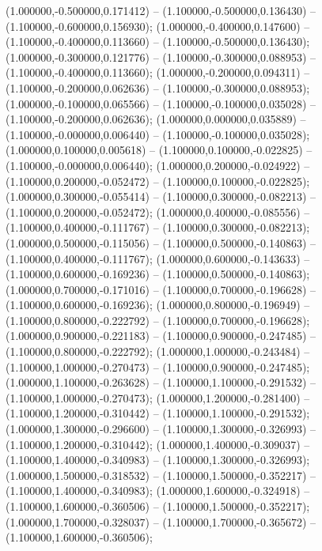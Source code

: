  (1.000000,-0.500000,0.171412) -- (1.100000,-0.500000,0.136430) -- (1.100000,-0.600000,0.156930);
 (1.000000,-0.400000,0.147600) -- (1.100000,-0.400000,0.113660) -- (1.100000,-0.500000,0.136430);
 (1.000000,-0.300000,0.121776) -- (1.100000,-0.300000,0.088953) -- (1.100000,-0.400000,0.113660);
 (1.000000,-0.200000,0.094311) -- (1.100000,-0.200000,0.062636) -- (1.100000,-0.300000,0.088953);
 (1.000000,-0.100000,0.065566) -- (1.100000,-0.100000,0.035028) -- (1.100000,-0.200000,0.062636);
 (1.000000,0.000000,0.035889) -- (1.100000,-0.000000,0.006440) -- (1.100000,-0.100000,0.035028);
 (1.000000,0.100000,0.005618) -- (1.100000,0.100000,-0.022825) -- (1.100000,-0.000000,0.006440);
 (1.000000,0.200000,-0.024922) -- (1.100000,0.200000,-0.052472) -- (1.100000,0.100000,-0.022825);
 (1.000000,0.300000,-0.055414) -- (1.100000,0.300000,-0.082213) -- (1.100000,0.200000,-0.052472);
 (1.000000,0.400000,-0.085556) -- (1.100000,0.400000,-0.111767) -- (1.100000,0.300000,-0.082213);
 (1.000000,0.500000,-0.115056) -- (1.100000,0.500000,-0.140863) -- (1.100000,0.400000,-0.111767);
 (1.000000,0.600000,-0.143633) -- (1.100000,0.600000,-0.169236) -- (1.100000,0.500000,-0.140863);
 (1.000000,0.700000,-0.171016) -- (1.100000,0.700000,-0.196628) -- (1.100000,0.600000,-0.169236);
 (1.000000,0.800000,-0.196949) -- (1.100000,0.800000,-0.222792) -- (1.100000,0.700000,-0.196628);
 (1.000000,0.900000,-0.221183) -- (1.100000,0.900000,-0.247485) -- (1.100000,0.800000,-0.222792);
 (1.000000,1.000000,-0.243484) -- (1.100000,1.000000,-0.270473) -- (1.100000,0.900000,-0.247485);
 (1.000000,1.100000,-0.263628) -- (1.100000,1.100000,-0.291532) -- (1.100000,1.000000,-0.270473);
 (1.000000,1.200000,-0.281400) -- (1.100000,1.200000,-0.310442) -- (1.100000,1.100000,-0.291532);
 (1.000000,1.300000,-0.296600) -- (1.100000,1.300000,-0.326993) -- (1.100000,1.200000,-0.310442);
 (1.000000,1.400000,-0.309037) -- (1.100000,1.400000,-0.340983) -- (1.100000,1.300000,-0.326993);
 (1.000000,1.500000,-0.318532) -- (1.100000,1.500000,-0.352217) -- (1.100000,1.400000,-0.340983);
 (1.000000,1.600000,-0.324918) -- (1.100000,1.600000,-0.360506) -- (1.100000,1.500000,-0.352217);
 (1.000000,1.700000,-0.328037) -- (1.100000,1.700000,-0.365672) -- (1.100000,1.600000,-0.360506);
